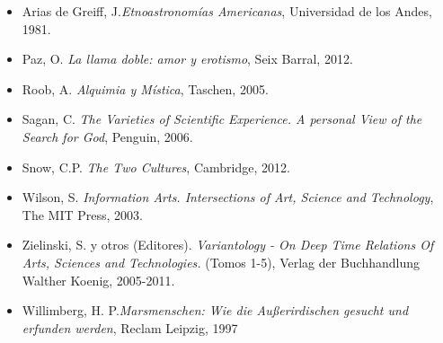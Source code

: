 \documentclass{report}
\begin{document}
\begin{itemize}

\item Arias de Greiff, J.\emph{Etnoastronom\'ias Americanas}, Universidad de los Andes, 1981.
\item Paz, O. \emph{La llama doble: amor y erotismo}, Seix Barral, 2012.
\item Roob, A. \emph{Alquimia y M\'istica}, Taschen, 2005.
\item Sagan, C. \emph{The Varieties of Scientific Experience. A personal View of the Search for God}, Penguin, 2006.
\item Snow, C.P. \emph{The Two Cultures}, Cambridge, 2012.
\item Wilson, S. \emph{Information Arts. Intersections of Art, Science
and Technology}, The MIT Press, 2003.
\item Zielinski, S. y otros (Editores). \emph{Variantology - On Deep Time
  Relations Of Arts, Sciences and Technologies.} (Tomos 1-5), Verlag
der Buchhandlung Walther Koenig, 2005-2011.

\item Willimberg, H. P.\emph{Marsmenschen:  Wie die Au\ss erirdischen
  gesucht und erfunden werden}, Reclam Leipzig, 1997

\end{itemize}
\end{document}
